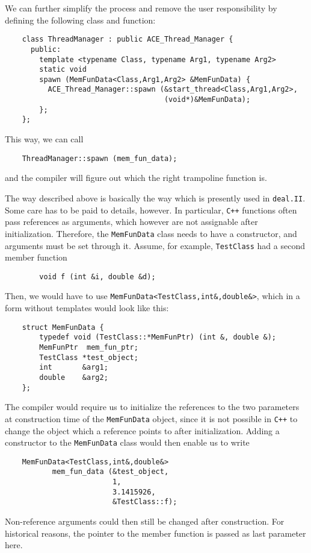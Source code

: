 \documentclass[11pt]{article}
\begin{document}
We can further simplify the process and remove the user responsibility by
defining the following class and function:
\begin{verbatim}
    class ThreadManager : public ACE_Thread_Manager {
      public:
        template <typename Class, typename Arg1, typename Arg2>
        static void 
        spawn (MemFunData<Class,Arg1,Arg2> &MemFunData) {
          ACE_Thread_Manager::spawn (&start_thread<Class,Arg1,Arg2>,
                                     (void*)&MemFunData);
        };
    };
\end{verbatim}
This way, we can call
\begin{verbatim}
    ThreadManager::spawn (mem_fun_data);
\end{verbatim}
and the compiler will figure out which the right trampoline function is.

The way described above is basically the way which is presently used in
\texttt{deal.II}. Some care has to be paid to details, however. In particular,
\texttt{C++} functions often pass references as arguments, which however are
not assignable after initialization. Therefore, the \texttt{MemFunData} class
needs to have a constructor, and arguments must be set through it. Assume, for
example, \texttt{TestClass} had a second member function
\begin{verbatim}
        void f (int &i, double &d);
\end{verbatim}
Then, we would have to use \texttt{MemFunData<TestClass,int\&,double\&>},
which in a form without templates would look like this:
\begin{verbatim}
    struct MemFunData {
        typedef void (TestClass::*MemFunPtr) (int &, double &);
        MemFunPtr  mem_fun_ptr;
        TestClass *test_object;
        int       &arg1;
        double    &arg2;
    };
\end{verbatim}
The compiler would require us to initialize the references to the two
parameters at construction time of the \texttt{MemFunData} object, since
it is not possible in \texttt{C++} to change the object which a reference
points to after initialization. Adding a constructor to the
\texttt{MemFunData} class would then enable us to write
\begin{verbatim}
    MemFunData<TestClass,int&,double&>  
           mem_fun_data (&test_object,
                         1,
                         3.1415926,
                         &TestClass::f);
\end{verbatim}
Non-reference arguments could then still be changed after construction. For
historical reasons, the pointer to the member function is passed as last
parameter here.
\end{document}
